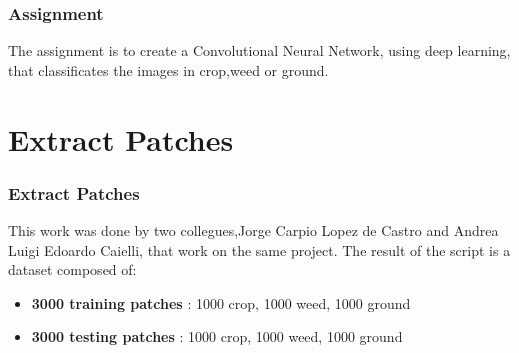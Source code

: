\documentclass{beamer}
\begin{document}

\begin{frame}
\frametitle{Assignment}
The assignment is to create a Convolutional Neural Network, using deep learning, that classificates the images in crop,weed or ground. 

\end{frame}



\section{Extract Patches}

\begin{frame}
\frametitle{Extract Patches}
This work was done by two collegues,Jorge Carpio Lopez de Castro and  Andrea Luigi Edoardo Caielli, that work on the same project. The result of the script is a dataset composed of:

\begin{itemize}
	\item \textbf{3000 training patches} : 1000 crop, 1000 weed, 1000 ground 
	\item \textbf{3000 testing patches} : 1000 crop, 1000 weed, 1000 ground
\end{itemize}

\end{frame}


\end{document}

